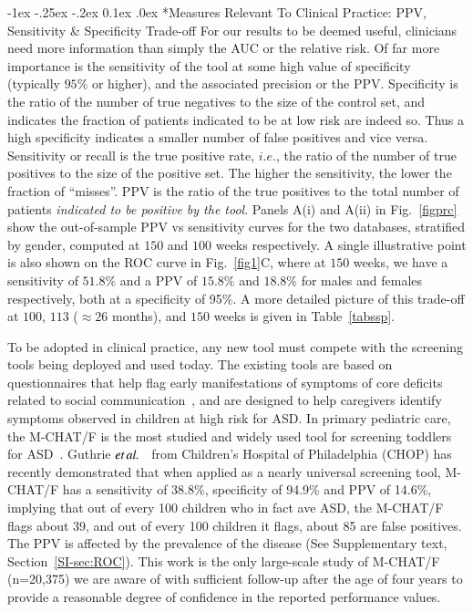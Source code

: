 \documentclass[onecolumn,,10pt]{IEEEtran}
\makeatletter
\renewcommand\subsection{\@startsection {section}{1}{\z@}%
  {-1ex \@plus -.25ex \@minus -.2ex}%
  {0.1ex \@plus.0ex}%
  {\fontsize{11}{12}\selectfont\bfseries\sffamily\color{DodgerBlue4}}}
\def\treatment{positive\xspace}
\makeatother
\begin{document}
\subsection*{Measures Relevant To Clinical Practice: PPV, Sensitivity \& Specificity Trade-off}
For our results to be deemed useful, clinicians need more information than simply the AUC or the relative risk. Of far more importance is the sensitivity of the tool at some high value of specificity (typically $95\%$ or higher), and the associated precision or the PPV. Specificity is the ratio of the number of true negatives to the size of the control set, and indicates  the fraction of patients indicated to be at low risk are indeed so. Thus a high specificity indicates a smaller number of false positives and vice versa. Sensitivity or recall is the true positive rate, $i.e.$, the ratio of the number of true positives to the size of the \treatment set. The higher the sensitivity, the lower the fraction of ``misses''. PPV is the ratio of the true positives to the total number of patients \textit{indicated to be positive by the tool}.
Panels A(i) and A(ii) in Fig.~\ref{figprc}  show  the out-of-sample  PPV vs sensitivity curves   for the two databases, stratified by gender, computed at $150$ and $100$ weeks  respectively. A single illustrative point is also shown on the ROC curve in Fig.~\ref{fig1}C, where at $150$ weeks, we have a sensitivity of $51.8\%$ and a PPV of $15.8\%$ and $18.8\%$ for males and females respectively, both at a specificity of 95\%. A more detailed picture of this trade-off  at $100$, $113$ ($\approx 26$ months), and $150$ weeks is given in Table~\ref{tabssp}.

To be  adopted in clinical practice, any new tool must compete with the screening tools being deployed and used today. The existing tools  are based on questionnaires that help flag early manifestations of symptoms of core deficits related to social communication~\cite{hyman2020identification}, and are   designed to help caregivers identify  symptoms observed in children at high risk for ASD. In  primary pediatric care, the M-CHAT/F is the most studied and widely used tool
for screening toddlers for ASD~\cite{robins2014validation,hyman2020identification}.
%
Guthrie $\textit{et} \mspace{3mu} \textit{al.}$~\cite{pmid31562252} from Children's Hospital of Philadelphia (CHOP) has recently demonstrated that when applied as a nearly universal screening tool, M-CHAT/F has a sensitivity of 38.8\%, specificity of 94.9\% and PPV of 14.6\%, implying that out of every 100 children who in fact ave ASD, the M-CHAT/F flags about 39, and out of every 100 children it flags, about 85 are false positives. The PPV is affected by the prevalence of the disease (See Supplementary text, Section~\ref{SI-sec:ROC}). This work is the only large-scale study of M-CHAT/F (n=20,375) we are aware of with sufficient follow-up after the age of four years to provide a reasonable degree of confidence in the reported performance values.
\end{document}
